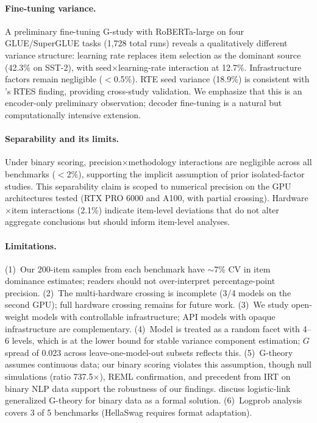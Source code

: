 \documentclass[11pt,letterpaper]{article}
\begin{document}
\paragraph{Fine-tuning variance.}
A preliminary fine-tuning G-study with RoBERTa-large on four GLUE/SuperGLUE tasks (1,728 total runs) reveals a qualitatively different variance structure: learning rate replaces item selection as the dominant source (42.3\% on SST-2), with seed$\times$learning-rate interaction at 12.7\%. Infrastructure factors remain negligible ($<$0.5\%). RTE seed variance (18.9\%) is consistent with \citet{bui2025}'s RTES finding, providing cross-study validation. We emphasize that this is an encoder-only preliminary observation; decoder fine-tuning is a natural but computationally intensive extension.

\paragraph{Separability and its limits.}
Under binary scoring, precision$\times$methodology interactions are negligible across all benchmarks ($<$2\%), supporting the implicit assumption of prior isolated-factor studies. This separability claim is scoped to numerical precision on the GPU architectures tested (RTX PRO 6000 and A100, with partial crossing). Hardware$\times$item interactions (2.1\%) indicate item-level deviations that do not alter aggregate conclusions but should inform item-level analyses.

\paragraph{Limitations.}
(1)~Our 200-item samples from each benchmark have $\sim$7\% CV in item dominance estimates; readers should not over-interpret percentage-point precision. (2)~The multi-hardware crossing is incomplete (3/4 models on the second GPU); full hardware crossing remains for future work. (3)~We study open-weight models with controllable infrastructure; API models with opaque infrastructure \citep{mesting2026} are complementary. (4)~Model is treated as a random facet with 4--6 levels, which is at the lower bound for stable variance component estimation; $G$ spread of 0.023 across leave-one-model-out subsets reflects this. (5)~G-theory assumes continuous data; our binary scoring violates this assumption, though null simulations (ratio 737.5$\times$), REML confirmation, and precedent from IRT on binary NLP data \citep{lalor2019learning} support the robustness of our findings. \citet{jiang2017logistic} discuss logistic-link generalized G-theory for binary data as a formal solution. (6)~Logprob analysis covers 3 of 5 benchmarks (HellaSwag requires format adaptation).
\end{document}
